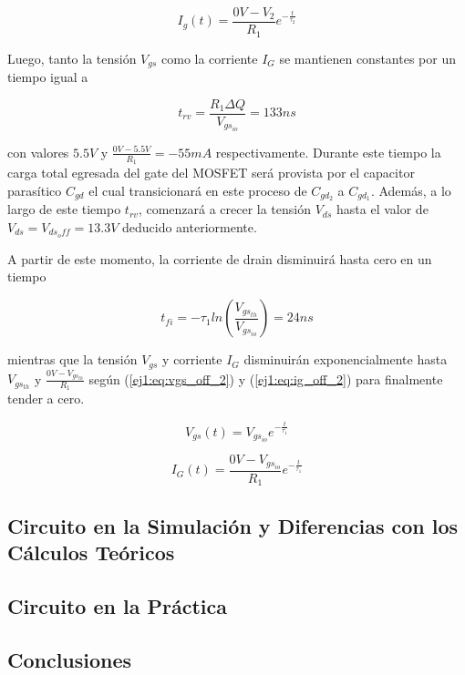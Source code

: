 \begin{equation}
I_{g}(t) = \frac{0V-V_2}{R_1} e^{-\frac{t}{\tau_2}}
\label{ej1:eq:ig_off_1}
\end{equation}

Luego, tanto la tensión $V_{gs}$ como la corriente $I_G$ se mantienen constantes por un tiempo igual a 

\begin{equation}
t_{rv} = \frac{R_1 \Delta Q}{V_{gs_{io}}} = 133ns
\label{ej1:eq:trv}
\end{equation}

con valores $5.5V$ y $\frac{0V-5.5V}{R_1} = -55mA$ respectivamente. Durante este tiempo la carga total egresada del gate del MOSFET será provista por el capacitor parasítico $C_{gd}$ el cual transicionará en este proceso de $C_{gd_2}$ a $C_{gd_1}$. Además, a lo largo de este tiempo $t_{rv}$, comenzará a crecer la tensión $V_{ds}$ hasta el valor de $V_{ds} = V_{ds_off} = 13.3V$ deducido anteriormente.

A partir de este momento, la corriente de drain disminuirá hasta cero en un tiempo

\begin{equation}
t_{fi} = -\tau_1 ln\left( \frac{V_{gs_{th}}}{V_{gs_{io}}} \right) = 24ns
\label{ej1:eq:tfi}
\end{equation}

mientras que la tensión $V_{gs}$ y corriente $I_G$ disminuirán exponencialmente hasta $V_{gs_{th}}$ y $\frac{0V-V_{gs_{th}}}{R_1}$ según (\ref{ej1:eq:vgs_off_2}) y (\ref{ej1:eq:ig_off_2}) para finalmente tender a cero.

\begin{equation}
V_{gs}(t) = V_{gs_{io}} e^{-\frac{t}{\tau_1}}
\label{ej1:eq:vgs_off_2}
\end{equation}

\begin{equation}
I_{G}(t) = \frac{0V-V_{gs_{io}}}{R_1} e^{-\frac{t}{\tau_1}}
\label{ej1:eq:ig_off_2}
\end{equation}

\subsection{Circuito en la Simulación y Diferencias con los Cálculos Teóricos}



\subsection{Circuito en la Práctica}

\subsection{Conclusiones}

